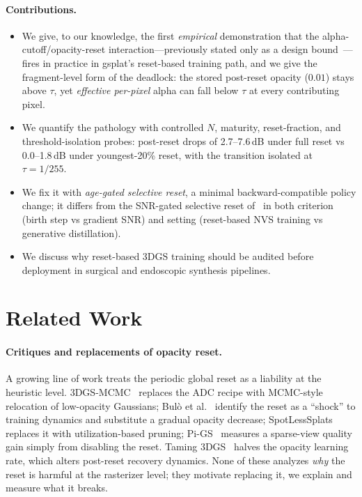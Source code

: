 \documentclass[runningheads]{llncs}
\begin{document}
\paragraph{Contributions.}
\begin{itemize}
\item We give, to our knowledge, the first \emph{empirical} demonstration that the alpha-cutoff/opacity-reset interaction---previously stated only as a design bound~\cite{fastergs2026}---fires in practice in gsplat's reset-based training path, and we give the fragment-level form of the deadlock: the stored post-reset opacity ($0.01$) stays above $\tau$, yet \emph{effective per-pixel} alpha can fall below $\tau$ at every contributing pixel.
\item We quantify the pathology with controlled $N$, maturity, reset-fraction, and threshold-isolation probes: post-reset drops of 2.7--7.6\,dB under full reset vs 0.0--1.8\,dB under youngest-20\% reset, with the transition isolated at $\tau = 1/255$.
\item We fix it with \emph{age-gated selective reset}, a minimal backward-compatible policy change; it differs from the SNR-gated selective reset of~\cite{cadam2026} in both criterion (birth step vs gradient SNR) and setting (reset-based NVS training vs generative distillation).
\item We discuss why reset-based 3DGS training should be audited before deployment in surgical and endoscopic synthesis pipelines.
\end{itemize}

\section{Related Work}

\paragraph{Critiques and replacements of opacity reset.} A growing line of work treats the periodic global reset as a liability at the heuristic level. 3DGS-MCMC~\cite{mcmc2024} replaces the ADC recipe with MCMC-style relocation of low-opacity Gaussians; Bul\`o et al.~\cite{revising2024} identify the reset as a ``shock'' to training dynamics and substitute a gradual opacity decrease; SpotLessSplats~\cite{spotless2025} replaces it with utilization-based pruning; Pi-GS~\cite{pigs2026} measures a sparse-view quality gain simply from disabling the reset. Taming 3DGS~\cite{taming2024} halves the opacity learning rate, which alters post-reset recovery dynamics. None of these analyzes \emph{why} the reset is harmful at the rasterizer level; they motivate replacing it, we explain and measure what it breaks.
\end{document}
